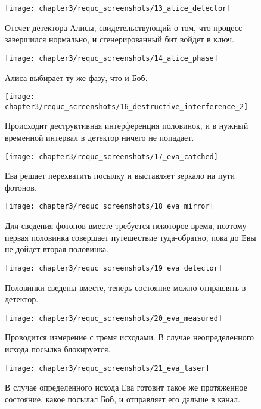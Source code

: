 \begin{figure}[h]
  \texttt{[image: chapter3/requc\_screenshots/13\_alice\_detector]}
  \caption{Отсчет детектора Алисы, свидетельствующий о том, что процесс завершился нормально, и сгенерированный бит войдет в ключ.}
\end{figure}

\begin{figure}[h]
  \texttt{[image: chapter3/requc\_screenshots/14\_alice\_phase]}
  \caption{Алиса выбирает ту же фазу, что и Боб.}
\end{figure}

\begin{figure}[h]
  \texttt{[image: chapter3/requc\_screenshots/16\_destructive\_interference\_2]}
  \caption{Происходит деструктивная интерференция половинок, и в нужный временной интервал в детектор ничего не попадает.}
\end{figure}


\begin{figure}[h]
  \texttt{[image: chapter3/requc\_screenshots/17\_eva\_catched]}
  \caption{Ева решает перехватить посылку и выставляет зеркало на пути фотонов.}
\end{figure}

\begin{figure}[h]
  \texttt{[image: chapter3/requc\_screenshots/18\_eva\_mirror]}
  \caption{Для сведения фотонов вместе требуется некоторое время, поэтому первая половинка совершает путешествие туда-обратно, пока до Евы не дойдет вторая половинка.}
\end{figure}

\begin{figure}[h]
  \texttt{[image: chapter3/requc\_screenshots/19\_eva\_detector]}
  \caption{Половинки сведены вместе, теперь состояние можно отправлять в детектор.}
\end{figure}

\begin{figure}[h]
  \texttt{[image: chapter3/requc\_screenshots/20\_eva\_measured]}
  \caption{Проводится измерение с тремя исходами. В случае неопределенного исхода посылка блокируется.}
\end{figure}

\begin{figure}[h]
  \texttt{[image: chapter3/requc\_screenshots/21\_eva\_laser]}
  \caption{В случае определенного исхода Ева готовит такое же протяженное состояние, какое посылал Боб, и отправляет его дальше в канал.}
\end{figure}

